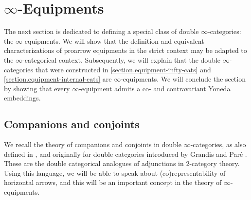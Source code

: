 \documentclass[a4paper, 11pt]{amsart}
\numberwithin{theorem}{section}
\theoremstyle{definition}
\begin{document}
\section{\texorpdfstring{$\infty$}{∞}-Equipments}\label{section.equipments}

The next section is dedicated to defining a special class of double $\infty$-categories:
the
 $\infty$-equipments. We will show that the definition and equivalent characterizations of proarrow equipments 
in the strict context \cite[Definition 4.8]{ShulmanFramedBicats} 
may be adapted to the $\infty$-categorical context.
Subsequently, we will explain
that the double $\infty$-categories that were constructed in \cref{section.equipment-infty-cats} and \cref{section.equipment-internal-cats} 
are $\infty$-equip\-ments. 
We will conclude the section by showing that every $\infty$-equipment admits a co- and contravariant Yoneda embeddings.

\subsection{Companions and conjoints}\label{ssection.compconj} We recall the theory of companions and conjoints in double $\infty$-categories, as also defined in \cite{Comp}, 
and originally for double categories introduced by Grandis and Par\'e \cite{GrandisPare}.
These are the double categorical analogues of adjunctions in 2-category theory. Using this language, we will be able to speak about (co)representability of horizontal arrows, and this will be an important 
concept in the theory of $\infty$-equipments. 
\end{document}
